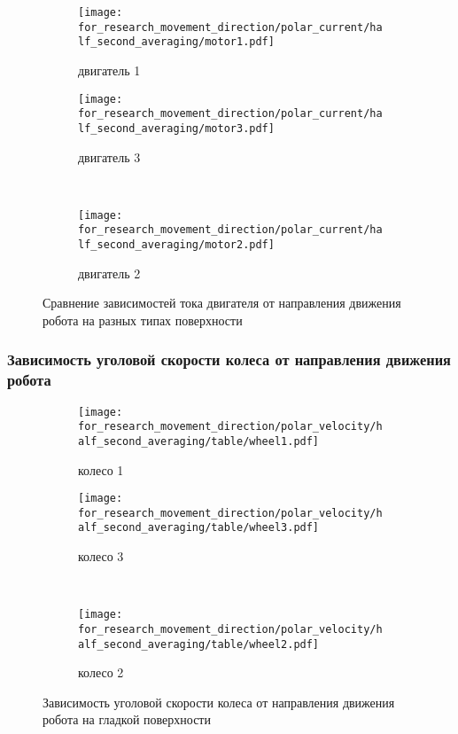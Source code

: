 \begin{figure}[H]
    \centering
    \begin{subfigure}{0.49\textwidth}
        \centering
        \texttt{[image: for\_research\_movement\_direction/polar\_current/half\_second\_averaging/motor1.pdf]}
        \caption{двигатель 1}
    \end{subfigure}
    \hspace{0.005\textwidth}
    \begin{subfigure}{0.49\textwidth}
        \centering
        \texttt{[image: for\_research\_movement\_direction/polar\_current/half\_second\_averaging/motor3.pdf]}
        \caption{двигатель 3}
    \end{subfigure} \\
    \vspace{4pt}
    \centering
    \begin{subfigure}{0.49\textwidth}
        \centering
        \texttt{[image: for\_research\_movement\_direction/polar\_current/half\_second\_averaging/motor2.pdf]}
        \caption{двигатель 2}
    \end{subfigure}
    \caption{Сравнение зависимостей тока двигателя от направления движения робота на разных типах поверхности}
\end{figure}

\subsubsection{Зависимость уголовой скорости колеса от направления движения робота}

\begin{figure}[H]
    \centering
    \begin{subfigure}{0.45\textwidth}
        \centering
        \texttt{[image: for\_research\_movement\_direction/polar\_velocity/half\_second\_averaging/table/wheel1.pdf]}
        \caption{колесо 1}
    \end{subfigure}
    \hspace{0.005\textwidth}
    \begin{subfigure}{0.45\textwidth}
        \centering
        \texttt{[image: for\_research\_movement\_direction/polar\_velocity/half\_second\_averaging/table/wheel3.pdf]}
        \caption{колесо 3}
    \end{subfigure} \\
    \vspace{4pt}
    \centering
    \begin{subfigure}{0.45\textwidth}
        \centering
        \texttt{[image: for\_research\_movement\_direction/polar\_velocity/half\_second\_averaging/table/wheel2.pdf]}
        \caption{колесо 2}
    \end{subfigure}
    \caption{Зависимость уголовой скорости колеса от направления движения робота на гладкой поверхности}
\end{figure}

